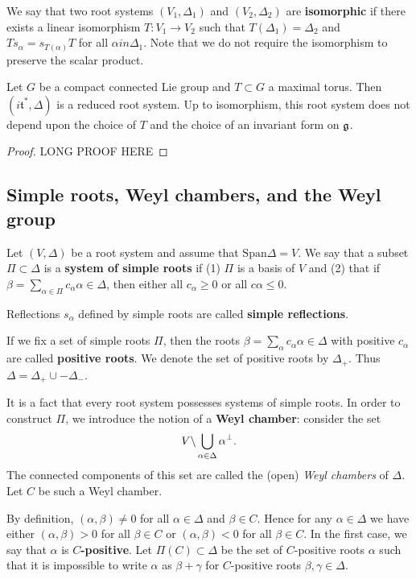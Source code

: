 \documentclass[11pt, english]{article}
\begin{document}
We say that two root systems $(V_1, \Delta_1)$ and $(V_2, \Delta_2)$ are \textbf{isomorphic} if there exists a linear isomorphism $T:V_1 \to V_2$ such that $T(\Delta_1)=\Delta_2$ and $T s_\alpha = s_{T(\alpha)} T$ for all $\alpha in \Delta_1$. Note that we do not require the isomorphism to preserve the scalar product.

\begin{thm}
 Let $G$ be a compact connected Lie group and $T \subset G$ a maximal torus. Then $(i \mathfrak  t^\ast, \Delta)$ is a reduced root system. Up to isomorphism, this root system does not depend upon the choice of $T$ and the choice of an invariant form on $\mathfrak g$.
\end{thm}

\begin{proof}
LONG PROOF HERE
\end{proof}

\subsection{Simple roots, Weyl chambers, and the Weyl group}

Let $(V,\Delta)$ be a root system and assume that $\mathrm{Span} \Delta = V$.  We say that a subset $\Pi \subset \Delta$ is a \textbf{system of simple roots} if (1) $\Pi$ is a basis of $V$ and (2) that if $\beta = \sum_{\alpha \in \Pi} c_\alpha \alpha \in \Delta$, then either all $c_\alpha \geq 0$ or all $c \alpha \leq 0$.

Reflections $s_\alpha$ defined by simple roots are called \textbf{simple reflections}.

If we fix a set of simple roots $\Pi$, then the roots $\beta = \sum_\alpha c_\alpha \alpha \in \Delta$ with positive $c_\alpha$ are called \textbf{positive roots}. We denote the set of positive roots by $\Delta_+$. Thus $\Delta = \Delta_+ \cup -\Delta_-$.

It is a fact that every root system possesses systems of simple roots. In order to construct $\Pi$, we introduce the notion of a \textbf{Weyl chamber}: consider the set 
$$
V \backslash \bigcup_{\alpha \in \Delta} \alpha^\perp.
$$
The connected components of this set are called the (open) \emph{Weyl chambers} of $\Delta$. Let $C$ be such a Weyl chamber. 

By definition, $(\alpha, \beta) \neq 0$ for all $\alpha \in \Delta$ and $\beta \in C$. Hence for any $\alpha \in \Delta$ we have either $(\alpha, \beta) > 0$ for all $\beta \in C$ or $(\alpha, \beta) < 0$ for all $\beta \in C$. In the first case, we say that $\alpha$ is \textbf{$C$-positive}. Let $\Pi(C) \subset \Delta$ be the set of $C$-positive roots $\alpha$ such that it is impossible to write $\alpha$ as $\beta+\gamma$ for $C$-positive roots $\beta, \gamma \in \Delta$.
\end{document}
